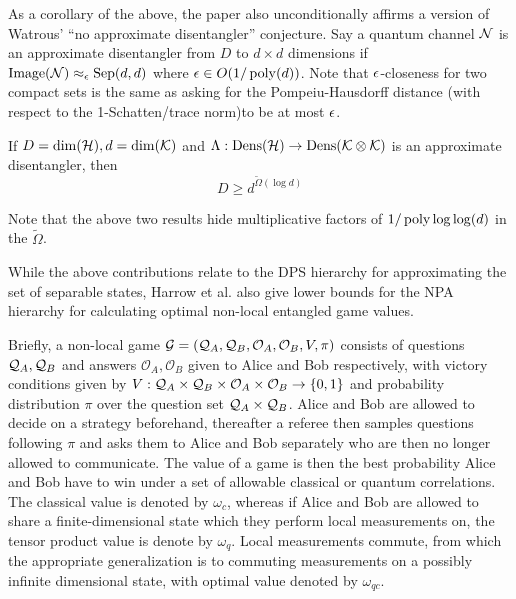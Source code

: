 \documentclass[runningheads,a4paper,english]{llncs}[2022/01/12]
\begin{document}
As a corollary of the above, the paper also unconditionally affirms a version of Watrous' ``no approximate disentangler'' conjecture.
Say a quantum channel $\mathcal{N}$ is an approximate disentangler from $D$ to $d\times d$ dimensions if $\operatorname{Image}(\mathcal{N}) \approx_{\epsilon} \operatorname{Sep}(d, d)$ where $\epsilon \in O(1/\operatorname{poly}(d))$.
Note that $\epsilon$-closeness for two compact sets is the same as asking for the Pompeiu-Hausdorff distance (with respect to the 1-Schatten/trace norm)to be at most $\epsilon$.
\begin{theorem}\label{thm:2}
If $D = \dim(\mathcal{H}), d = \dim(\mathcal{K})$ and $\Lambda : \operatorname{Dens}(\mathcal{H}) \to \operatorname{Dens}(\mathcal{K}\otimes \mathcal{K})$ is an approximate disentangler, then
\[D \ge d^{\tilde{\Omega}(\log d)}\]
\end{theorem}
Note that the above two results hide multiplicative factors of $1/\operatorname{poly} \log\log(d)$ in the $\tilde{\Omega}$.

While the above contributions relate to the DPS hierarchy for approximating the set of separable states, Harrow et al. also give lower bounds for the NPA hierarchy for calculating optimal non-local entangled game values.

Briefly, a non-local game $\mathcal{G} = (\mathcal{Q}_A, \mathcal{Q}_B, \mathcal{O}_A, \mathcal{O}_B, V, \pi)$ consists of questions $\mathcal{Q}_A, \mathcal{Q}_B$ and answers $\mathcal{O}_A, \mathcal{O}_B$ given to Alice and Bob respectively, with victory conditions given by $V: \mathcal{Q}_A \times \mathcal{Q}_B \times \mathcal{O}_A \times \mathcal{O}_B \to \{0,1\}$ and probability distribution $\pi$ over the question set $\mathcal{Q}_A \times \mathcal{Q}_B$. 
Alice and Bob are allowed to decide on a strategy beforehand, thereafter a referee then samples questions following $\pi$ and asks them to Alice and Bob separately who are then no longer allowed to communicate.
The value of a game is then the best probability Alice and Bob have to win under a set of allowable classical or quantum correlations.
The classical value is denoted by $\omega_c$, whereas if Alice and Bob are allowed to share a finite-dimensional state which they perform local measurements on, the tensor product value is denote by $\omega_q$.
Local measurements commute, from which the appropriate generalization is to commuting measurements on a possibly infinite dimensional state, with optimal value denoted by $\omega_{qc}$.
\end{document}
